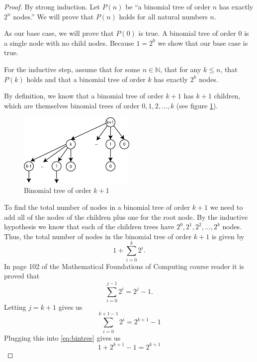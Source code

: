 \documentclass[10pt,letter]{article}
\begin{document}
\begin{proof}
By strong induction. Let $P(n)$ be ``a binomial tree of order $n$ has exactly $2^n$ nodes.'' We will prove that $P(n)$ holds for all natural numbers $n$. 

As our base case, we will prove that $P(0)$ is true. A binomial tree of order 0 is a single node with no child nodes. Because $1 = 2^0$ we show that our base case is true.

For the inductive step, assume that for some $n \in \mathbb{N}$, that for any $k \le n$, that $P(k)$ holds and that a binomial tree of order $k$ has exactly $2^k$ nodes. 

By definition, we know that a binomial tree of order $k+1$ has $k+1$ children, which are themselves binomial trees of order $0, 1, 2, \ldots, k$ (see figure \ref{fig:binTree}).

\begin{figure}[h]
    \centering
    \includegraphics[width=0.5\textwidth]{binTree.png}
    \caption{Binomial tree of order $k+1$}
    \label{fig:binTree}
\end{figure}

To find the total number of nodes in a binomial tree of order $k+1$ we need to add all of the nodes of the children plus one for the root node. By the inductive hypothesis we know that each of the children trees have $2^0, 2^1, 2^2, \ldots, 2^k$ nodes. Thus, the total number of nodes in the binomial tree of order $k+1$ is given by 
\begin{equation} \label{eq:bintree}
1 + \sum_{i=0}^{k} 2^i.
\end{equation} 
In page 102 of the Mathematical Foundations of Computing course reader it is proved that 
\begin{equation*}
\sum_{i=0}^{j-1} 2^i = 2^j - 1.
\end{equation*} 
Letting $j = k+1$ gives us 
\begin{equation*}
\sum_{i=0}^{k+1-1} 2^i = 2^{k+1} - 1
\end{equation*} 
Plugging this into \ref{eq:bintree} gives us
\begin{equation*}
1 + 2^{k+1} - 1 = 2^{k+1}
\end{equation*}

\end{proof}
\end{document}
